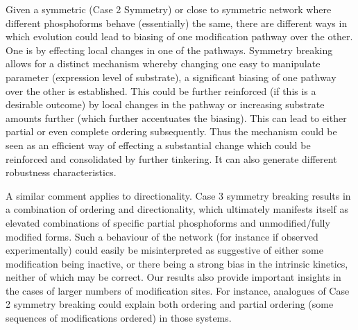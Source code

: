 \documentclass[9pt,lineno]{elife}
\begin{document}
Given a symmetric (Case 2 Symmetry) or close to symmetric network where different phosphoforms behave (essentially) the same, there are different ways in which evolution could lead to biasing of one modification pathway over the other. One is by effecting local changes in one of the pathways. Symmetry breaking allows for a distinct mechanism whereby changing one easy to manipulate parameter (expression level of substrate), a significant biasing of one pathway over the other is established. This could be further reinforced (if this is a desirable outcome) by local changes in the pathway or increasing substrate amounts further (which further accentuates the biasing). This can lead to either partial or even complete ordering subsequently.
Thus the mechanism could be seen as an efficient way of effecting a substantial change which could be reinforced and consolidated by further tinkering. It can also generate different robustness characteristics.




A similar comment applies to directionality. Case 3 symmetry breaking results in a combination of ordering and directionality, which ultimately manifests itself as elevated combinations of specific partial phosphoforms and unmodified/fully modified forms. Such a behaviour of the network (for instance if observed experimentally) could easily be misinterpreted as suggestive of either some modification being inactive, or there being a strong bias in the intrinsic kinetics, neither of which may be correct.
Our results also provide important insights in the cases of larger numbers of modification sites. For instance,
analogues of Case 2 symmetry breaking could explain both ordering and partial ordering (some sequences of modifications ordered) in those systems.
\end{document}
